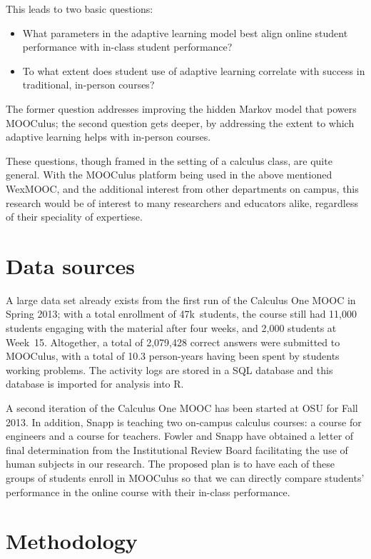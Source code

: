 \documentclass[12pt]{article}
\begin{document}
This leads to two basic questions:
\begin{itemize}
\item What parameters in the adaptive learning model best align online
  student performance with in-class student performance?
\item To what extent does student use of adaptive learning correlate
  with success in traditional, in-person courses?
\end{itemize}
The former question addresses improving the hidden Markov model that
powers MOOCulus; the second question gets deeper, by addressing the
extent to which adaptive learning helps with in-person courses.

These questions, though framed in the setting of a calculus class, are
quite general. With the MOOCulus platform being used in the above
mentioned WexMOOC, and the additional interest from other departments
on campus, this research would be of interest to many researchers and
educators alike, regardless of their speciality of expertiese.

\section{Data sources}

A large data set already exists from the first run of the Calculus One
MOOC in Spring 2013; with a total enrollment of 47k~students, the
course still had 11,000 students engaging with the material after four
weeks, and 2,000 students at Week~15.  Altogether, a total of
2,079,428 correct answers were submitted to MOOCulus, with a total of
10.3 person-years having been spent by students working problems.  The
activity logs are stored in a SQL database and this database is
imported for analysis into R.

A second iteration of the Calculus One MOOC has been started at OSU
for Fall 2013.  In addition, Snapp is teaching two on-campus calculus
courses: a course for engineers and a course for teachers.  Fowler and
Snapp have obtained a letter of final determination from the
Institutional Review Board facilitating the use of human subjects in
our research.  The proposed plan is to have each of these groups of
students enroll in MOOCulus so that we can directly compare students'
performance in the online course with their in-class performance.


\section{Methodology}
\end{document}
